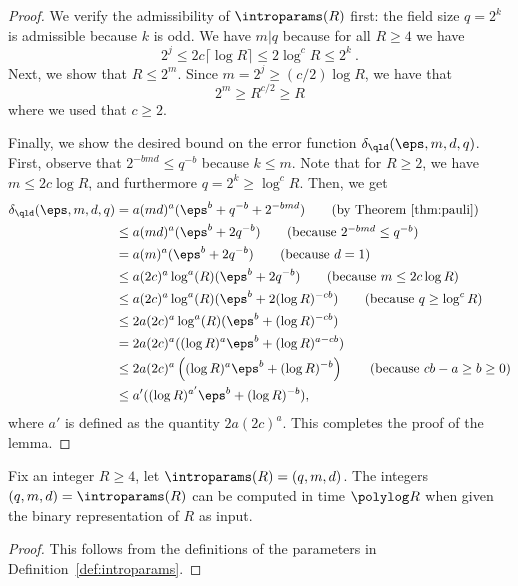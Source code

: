 \begin{proof}
  We verify the admissibility of $\introparams(R)$ first: the field size $q =
  2^k$ is admissible because $k$ is odd. We have $m | q$ because for all $R \geq 4$ we have  
  \[
  	2^j \leq 2 c \lceil \log R \rceil \leq 2 \log^c R \leq 2^k~.
  \]
	Next, we show that $R \leq 2^m$. Since $m = 2^j \geq (c/2) \log R$, we have that
	\[
		2^m \geq R^{c/2} \geq R
	\]
	where we used that $c \geq 2$. 

Finally, we show the desired bound on the error function $\delta_\qld(\eps,m,d,q)$. First, observe that $2^{-bmd} \leq q^{-b}$ because $k \leq m$.
  Note that for $R \geq 2$, we have $m \leq 2c \log R$, and furthermore $q =
  2^k \geq \log^c R$.
Then, we get
\begin{align*}
  	\delta_\qld(\eps,m,d,q)
    & = a (md)^a (\eps^b + q^{-b} + 2^{-bmd}) \tag{by Theorem~\ref{thm:pauli}}  \\
    & \leq a (md)^a (\eps^b + 2q^{-b}) \tag{because  $2^{-bmd} \leq q^{-b}$}  \\
    & = a (m)^a (\eps^b + 2q^{-b}) \tag{because  $d=1$}  \\
    & \leq a (2c)^a \log^{a} (R) ( \eps^{b} + 2q^{-b}) \tag{because  $m \leq 2c \log R$}\\
    & \leq a (2c)^a \log^{a} (R) ( \eps^{b} + 2(\log R)^{-cb}) \tag{because  $q \geq \log^c R$}\\
    & \leq 2a (2c)^a \log^{a} (R) ( \eps^{b} + (\log R)^{-cb}) \\
    & = 2a (2c)^a ( (\log R)^{a}\eps^{b} + (\log R)^{a-cb}) \\
    & \leq 2a(2c)^{a} \left ( (\log R)^{a} \eps^{b}
      + (\log R)^{-b} \right) \tag{because  $cb - a \geq b \geq 0$}\\
    & \leq a' ( (\log R)^{a'} \eps^{b} + (\log R)^{-b}),
  \end{align*}
  where $a'$ is defined as the quantity $2a(2c)^a$.
This completes the proof of the lemma.
\end{proof}

\begin{lemma}
	\label{lem:introparams-complexity}
	Fix an integer $R \geq 4$, let $\introparams(R) = (q,m,d)$.
	The integers $(q,m,d) = \introparams(R)$ can be computed in time $\polylog
  R$ when given the binary representation of $R$ as input.
\end{lemma}
\begin{proof}
  This follows from the definitions of the parameters in
  Definition~\ref{def:introparams}.
  
\end{proof}

